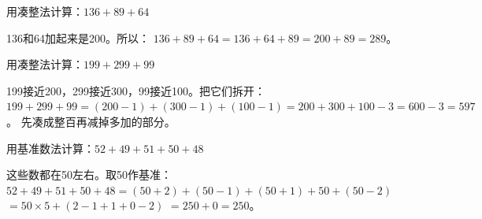 \begin{example}
用凑整法计算：$136+89+64$
\end{example}
\begin{solution}
136和64加起来是200。所以：
$136+89+64 = 136+64+89 = 200+89 = 289$。
\end{solution}

\begin{example}
用凑整法计算：$199+299+99$
\end{example}
\begin{solution}
199接近200，299接近300，99接近100。把它们拆开：
$199+299+99 = (200-1)+(300-1)+(100-1) = 200+300+100-3 = 600-3 = 597$。
先凑成整百再减掉多加的部分。
\end{solution}

\begin{example}
用基准数法计算：$52+49+51+50+48$
\end{example}
\begin{solution}
这些数都在50左右。取50作基准：
$52+49+51+50+48 = (50+2)+(50-1)+(50+1)+50+(50-2)$
$= 50\times5 + (2-1+1+0-2)$
$= 250 + 0 = 250$。
\end{solution}


